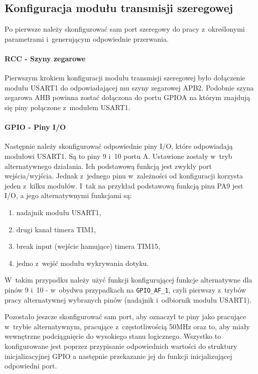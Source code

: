 \documentclass[eng,oneside]{mgr}
\begin{document}
			\subsection{Konfiguracja modułu transmisji szeregowej}
			Po pierwsze należy skonfigurować sam port szeregowy do pracy z~określonymi parametrami i~generującym odpowiednie przerwania.

				\paragraph{RCC - Szyny zegarowe}
				\label{sec:usart_rcc}
				Pierwszym krokiem konfiguracji modułu transmisji szeregowej było dołączenie modułu USART1 do odpowiadającej mu szyny zegarowej APB2. Podobnie szyna zegarowa AHB powinna zostać dołączona do portu GPIOA na którym znajdują się piny połączone z~modułem USART1.

				\paragraph{GPIO - Piny I/O}
				Następnie należy skonfigurować odpowiednie piny I/O, które odpowiadają modułowi USART1. Są to piny 9 i~10 portu A. Ustawione zostały w~tryb alternatywnego działania. Ich podstawową funkcją jest zwykły port wejścia/wyjścia. Jednak z~jednego pinu w~zależności od konfiguracji korzysta jeden z~kilku modułów. I~tak na przykład podstawową funkcją pinu PA9 jest I/O, a jego alternatywnymi funkcjami są:
				\begin{enumerate}
					\item nadajnik modułu USART1,
					\item drugi kanał timera TIM1,
					\item break input (wejście hamujące) timera TIM15,
					\item jedno z~wejść modułu wykrywania dotyku.
				\end{enumerate}
				W~takim przypadku należy użyć funkcji konfigurującej funkcje alternatywne dla pinów 9 i~10 - w~obydwu przypadkach na \texttt{GPIO\_AF\_1}, czyli pierwszy z~trybów pracy alternatywnej wybranych pinów (nadajnik i~odbiornik modułu USART1).

				Pozostało jeszcze skonfigurować sam port, aby oznaczył te piny jako pracujące w~trybie alternatywnym, pracujące z~częstotliwością 50MHz oraz to, aby miały wewnętrzne podciągnięcie do wysokiego stanu logicznego. Wszystko to konfigurowane jest poprzez przypisanie odpowiednich wartości do struktury inicjalizacyjnej GPIO a następnie przekazanie jej do funkcji inicjalizującej odpowiedni port. 
\end{document}
